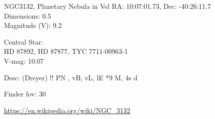 \begin{block}{NGC3132, Planetary Nebula in Vel}
    RA: 10:07:01.73, Dec: -40:26:11.7 \\ 
    Dimensions: 0.5 \\ 
    Magnitude (V): 9.2

    Central Star: \\ 
      \hspace{1em}HD 87892, HD 87877, TYC 7711-00963-1 \\ 
      \hspace{1em}V-mag: 10.07 

    Desc: (Dreyer) !! PN , vB, vL, lE *9 M, 4s  d 

    Finder fov: 30 

    \url{https://en.wikipedia.org/wiki/NGC_3132} 
\end{block}